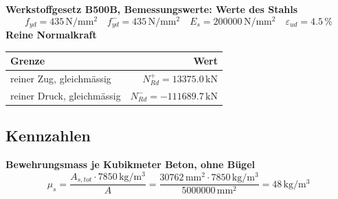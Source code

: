 \documentclass[11pt,a4paper]{article}
\begin{document}
\noindent\textbf{Werkstoffgesetz B500B, Bemessungswerte: Werte des Stahls}
\begin{equation*}
f_{yd} = 435\,\mathrm{N}/\mathrm{mm}^{2} \quad f_{yd}^{-} = 435\,\mathrm{N}/\mathrm{mm}^{2} \quad E_s = 200000\,\mathrm{N}/\mathrm{mm}^{2} \quad \varepsilon_{ud} = 4.5\,\%
\end{equation*}
\noindent\textbf{Reine Normalkraft}
\begin{longtable}{lr}
\hline
Grenze & Wert \\
\hline
\endhead
reiner Zug, gleichmässig & $N_{Rd}^{+} = 13375.0\,\mathrm{kN}$ \\
reiner Druck, gleichmässig & $N_{Rd}^{-} = -111689.7\,\mathrm{kN}$ \\
\hline
\end{longtable}
\subsection{Kennzahlen}
\noindent\textbf{Bewehrungsmass je Kubikmeter Beton, ohne Bügel}
\begin{equation*}
\mu_s = \frac{A_{s,tot} \cdot 7850\,\mathrm{kg}/\mathrm{m}^{3}}{A} = \frac{30762\,\mathrm{mm}^{2} \cdot 7850\,\mathrm{kg}/\mathrm{m}^{3}}{5000000\,\mathrm{mm}^{2}} = 48\,\mathrm{kg}/\mathrm{m}^{3}
\end{equation*}
\end{document}

